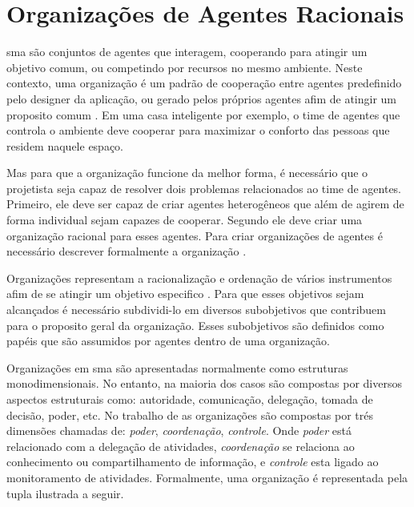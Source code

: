     \section{Organizações de Agentes Racionais}
    \label{sec:agent-org}
        
        \acrfull{sma} são conjuntos de agentes que interagem, cooperando para atingir um objetivo comum, ou competindo por recursos no mesmo ambiente. Neste contexto, uma organização é um padrão de cooperação entre agentes predefinido pelo designer da aplicação, ou gerado pelos próprios agentes afim de atingir um proposito comum \cite{boissier2004organization}. Em uma casa inteligente por exemplo, o time de agentes que controla o ambiente deve cooperar para maximizar o conforto das pessoas que residem naquele espaço. 
        
        Mas para que a organização funcione da melhor forma, é necessário que o projetista seja capaz de resolver dois problemas relacionados ao time de agentes. Primeiro, ele deve ser capaz de criar agentes heterogêneos que além de agirem de forma individual sejam capazes de cooperar. Segundo ele deve criar uma organização racional para esses agentes. Para criar organizações de agentes é necessário descrever formalmente a organização \cite{francoempirical}.
        
        \label{subsec:org-struct}
        Organizações representam a racionalização e ordenação de vários instrumentos afim de se atingir um objetivo especifico \cite{selznick1948foundations}. Para que esses objetivos sejam alcançados é necessário subdividi-lo em diversos subobjetivos que contribuem para o proposito geral da organização. Esses subobjetivos são definidos como papéis que são assumidos por agentes dentro de uma organização.
        
        Organizações em \acrshort{sma} são apresentadas normalmente como estruturas monodimensionais. No entanto, na maioria dos casos são compostas por diversos aspectos estruturais como: autoridade, comunicação, delegação, tomada de decisão, poder, etc. No trabalho de  as organizações são compostas por trés dimensões chamadas de: \emph{poder}, \emph{coordenação}, \emph{controle}. Onde \emph{poder} está relacionado com a delegação de atividades, \emph{coordenação} se relaciona ao conhecimento ou compartilhamento de informação, e \emph{controle} esta ligado ao monitoramento de atividades. Formalmente, uma organização é representada pela tupla ilustrada a seguir. 
        
